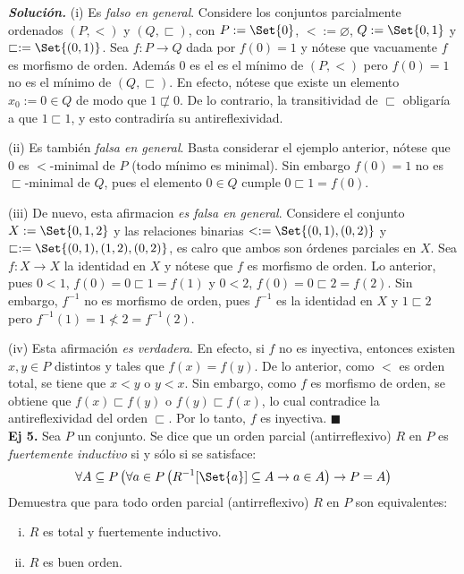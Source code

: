 \documentclass[11pt]{article}
\renewcommand{\emptyset}{\varnothing}
\newcommand{\QED}{\hfill\ensuremath{\blacksquare}}
\begin{document}
  \textbf{\textit{Solución.}} (i) Es \textit{falso en general}. Considere los conjuntos parcialmente ordenados $(P,<)$ y $(Q,\sqsubset)$, con $P:=\Set{0}$, $<:=\emptyset$, $Q:=\Set{0,1}$ y $\sqsubset:=\Set{(0,1)}$. Sea $f:P \to Q$ dada por $f(0)=1$ y nótese que vacuamente $f$ es morfismo de orden. Además $0$ es el es el mínimo de $(P,<)$ pero $f(0)=1$ no es el mínimo de $(Q,\sqsubset)$. En efecto, nótese que existe un elemento $x_0:=0 \in Q$ de modo que $1 \not\sqsubset 0$. De lo contrario, la transitividad de $\sqsubset$ obligaría a que $1 \sqsubset 1$, y esto contradiría su antireflexividad.

  (ii) Es también \textit{falsa en general}. Basta considerar el ejemplo anterior, nótese que $0$ es $<$-minimal de $P$ (todo mínimo es minimal). Sin embargo $f(0)=1$ no es $\sqsubset$-minimal de $Q$, pues el elemento $0 \in Q$ cumple $0 \sqsubset 1=f(0)$.

  (iii) De nuevo, esta afirmacion \textit{es falsa en general}. Considere el conjunto $X:=\Set{0,1,2}$ y las relaciones binarias $<:=\Set{(0,1),(0,2)}$ y $\sqsubset:=\Set{(0,1),(1,2),(0,2)}$, es calro que ambos son órdenes parciales en $X$. Sea $f:X \to X$ la identidad en $X$ y nótese que $f$ es morfismo de orden. Lo anterior, pues $0< 1$, $f(0)=0 \sqsubset 1=f(1)$ y $0< 2$, $f(0)=0 \sqsubset 2=f(2)$. Sin embargo, $f^{-1}$ no es morfismo de orden, pues $f^{-1}$ es la identidad en $X$ y $1 \sqsubset 2$ pero $f^{-1}(1)=1 \not< 2=f^{-1}(2)$.

  (iv) Esta afirmación \textit{es verdadera}. En efecto, si $f$ no es inyectiva, entonces existen $x,y \in P$ distintos y tales que $f(x)=f(y)$. De lo anterior, como $<$ es orden total, se tiene que $x<y$ o $y<x$. Sin embargo, como $f$ es morfismo de orden, se obtiene que $f(x) \sqsubset f(y)$ o $f(y) \sqsubset f(x)$, lo cual contradice la antireflexividad del orden $\sqsubset$. Por lo tanto, $f$ es inyectiva. \QED \\

  \textbf{Ej 5.} Sea $P$ un conjunto. Se dice que un orden parcial (antirreflexivo) $R$ en $P$ es \textit{fuertemente inductivo} si y sólo si se satisface:
  \[ \forall A \subseteq P \left( \forall a \in P \left( R^{-1}[\Set{a}] \subseteq A \rightarrow a \in A \right) \rightarrow P = A \right) \]
  Demuestra que para todo orden parcial (antirreflexivo) $R$ en $P$ son equivalentes:
  \begin{enumerate}[i)]
    \item $R$ es total y fuertemente inductivo.
    \item $R$ es buen orden.
  \end{enumerate}
\end{document}
